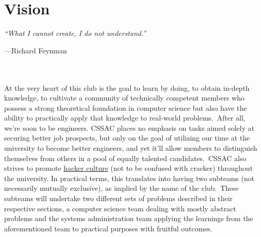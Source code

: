 \documentclass[11pt,twocolumn,oneside]{book}
\begin{document}
    \section{Vision}\label{sec:vision}
    \emph{``What I cannot create, I do not understand.''}{\par\hfill\small{---Richard Feynman}}
    \\\\
    At the very heart of this club is the goal to learn by doing, to obtain in-depth knowledge, to cultivate a community
    of technically competent members who possess a strong theoretical foundation in computer science but also have the
    ability to practically apply that knowledge to real-world problems.\ After all, we're soon to be engineers.
    CSSAC places no emphasis on tasks aimed solely at securing better job prospects, but only on the goal of
    utilizing our time at the university to become better engineers, and yet it'll allow members to distinguish
    themselves from others in a pool of equally talented candidates.\ CSSAC also strives to promote
    \href{https://wikipedia.org/wiki/Hacker_culture}{\color{blue}\underline{hacker culture}} (not to be confused with
    cracker) throughout the university.
    In practical terms, this translates into having two subteams (not necessarily mutually exclusive), as implied by the
    name of the club.\ These subteams will undertake two different sets of problems described in their respective
    sections, a computer science team dealing with mostly abstract problems and the systems administration team applying
    the learnings from the aforementioned team to practical purposes with fruitful outcomes.

\end{document}

